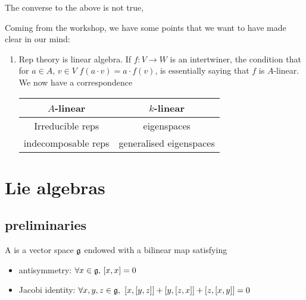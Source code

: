 \documentclass{article}
\begin{document}
\begin{remark}
The converse to the above is not true, 
\end{remark}

\begin{aside}
Coming from the workshop, we have some points that we want to have made clear in our mind:
\begin{enumerate}
    \item Rep theory is linear algebra. If $f:V \to W$ is an intertwiner, the condition that for $a \in A, \, v \in V$ $f(a \cdot v) = a \cdot f(v)$, is essentially saying that $f$ is $A$-linear. We now have a correspondence 
    \begin{center}
        \begin{tabular}{c|c} 
            $A$-linear & $k$-linear  \\ \hline 
            Irreducible reps & eigenspaces \\
            indecomposable reps & generalised eigenspaces
        \end{tabular}
    \end{center}

\end{enumerate}
\end{aside}

\section{Lie algebras}
\subsection{preliminaries}

\begin{definition}
A  is a vector space $\mf{g}$ endowed with a bilinear map 
satisfying
\begin{itemize}
    \item antisymmetry: $\forall x \in \mf{g}, \, \comm[x]{x} = 0$
    \item Jacobi identity: $\forall x, y, z \in \mf{g},$
    $\comm[x]{\comm[y]{z}} + \comm[y]{\comm[z]{x}} + \comm[z]{\comm[x]{y}} = 0$
\end{itemize}
\end{definition}
\end{document}
